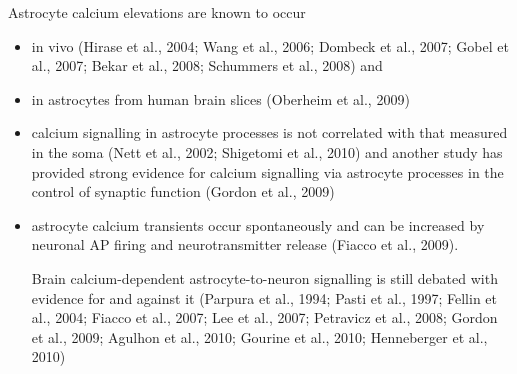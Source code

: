 Astrocyte calcium elevations are known to occur
\begin{itemize}
  \item   in vivo (Hirase et al., 2004; Wang et al., 2006; Dombeck et al.,
  2007; Gobel et al., 2007; Bekar et al., 2008; Schummers et al., 2008) and 
  
  \item in astrocytes from human brain slices (Oberheim et al., 2009)

   \item  calcium signalling in astrocyte processes is not correlated with that
   measured in the soma (Nett et al., 2002; Shigetomi et al., 2010) and another
   study has provided strong evidence for calcium signalling via astrocyte
   processes in the control of synaptic function (Gordon et al., 2009)   
  
  \item astrocyte calcium transients occur spontaneously and can be increased by
  neuronal AP firing and neurotransmitter release (Fiacco et al., 2009).
  
  Brain calcium-dependent astrocyte-to-neuron signalling is still debated with
  evidence for and against it 
  (Parpura et al., 1994; Pasti et al., 1997; Fellin et al., 2004; Fiacco et al.,
   2007; Lee et al., 2007; Petravicz et al., 2008; Gordon et al., 2009; Agulhon
   et al., 2010; Gourine et al., 2010; Henneberger et al., 2010)  
   
\end{itemize}



